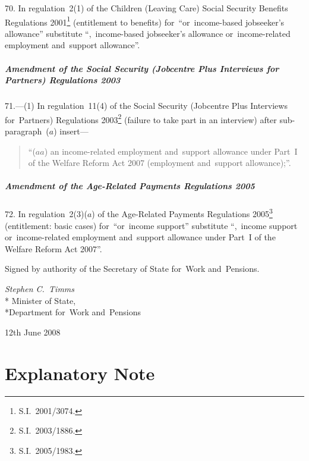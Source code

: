 \documentclass[12pt,a4paper]{article}
\begin{document}
70.  In regulation~2(1) of the Children (Leaving Care) Social Security Benefits Regulations 2001\footnote{S.I.~2001/3074.} (entitlement to benefits) for~“or~income-based jobseeker’s allowance” substitute “,~income-based jobseeker’s allowance or~income-related employment and~support allowance”.

\subsubsection[71. Amendment of the Social Security (Jobcentre Plus Interviews for Partners) Regulations 2003]{Amendment of the Social Security (Jobcentre Plus Interviews for Partners) Regulations 2003}

71.---(1)  In regulation~11(4) of the Social Security (Jobcentre Plus Interviews for~Partners) Regulations 2003\footnote{S.I.~2003/1886.} (failure to take part in an interview) after sub-paragraph~($a$)  insert—
\begin{quotation}
“($aa$) an income-related employment and~support allowance under Part~I of the Welfare Reform Act 2007 (employment and~support allowance);”.
\end{quotation}

\subsubsection[72. Amendment of the Age-Related Payments Regulations 2005]{Amendment of the Age-Related Payments Regulations 2005}

72.  In regulation~2(3)($a$)  of the Age-Related Payments Regulations 2005\footnote{S.I.~2005/1983.} (entitlement: basic cases) for~“or~income support” substitute “,~income support or~income-related employment and~support allowance under Part~I of the Welfare Reform Act 2007”. 

\bigskip

Signed 
by authority of the 
Secretary of State for~Work and~Pensions.

{\raggedleft
\emph{Stephen C.~Timms}\\*
Minister
of State,\\*Department 
for~Work and~Pensions

}

12th June 2008

\small

\part{Explanatory Note}
\end{document}
